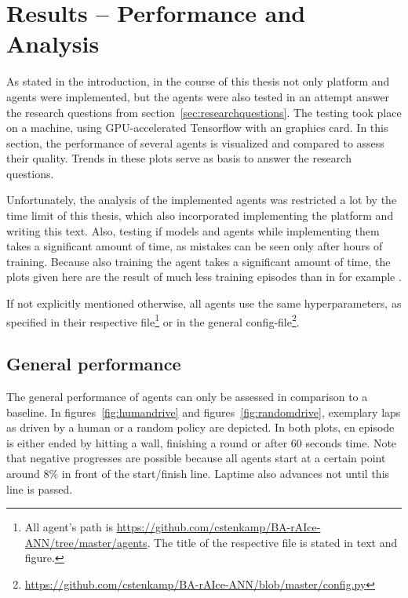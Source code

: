 \chapter{Results -- Performance and Analysis}

As stated in the introduction, in the course of this thesis not only platform and agents were implemented, but the agents were also tested in an attempt answer the research questions from section~\ref{sec:researchquestions}. The testing took place on a  machine, using GPU-accelerated Tensorflow with an  graphics card. In this section, the performance of several agents is visualized and compared to assess their quality. Trends in these plots serve as basis to answer the research questions. 

Unfortunately, the analysis of the implemented agents was restricted a lot by the time limit of this thesis, which also incorporated implementing the platform and writing this text. Also, testing if models and agents while implementing them takes a significant amount of time, as mistakes can be seen only after hours of training. Because also training the agent takes a significant amount of time, the plots given here are the result of much less training episodes than in for example \cite{mnih_human-level_2015}.

If not explicitly mentioned otherwise, all agents use the same hyperparameters, as specified in their respective file\footnote{All agent's path is \url{https://github.com/cstenkamp/BA-rAIce-ANN/tree/master/agents}. The title of the respective file is stated in text and figure.} or in the general config-file\footnote{\url{https://github.com/cstenkamp/BA-rAIce-ANN/blob/master/config.py}}.


\section{General performance}

The general performance of agents can only be assessed in comparison to a baseline. In figures~\ref{fig:humandrive} and figures~\ref{fig:randomdrive}, exemplary laps as driven by a human or a random policy are depicted. In both plots, en episode is either ended by hitting a wall, finishing a round or after 60 seconds time. Note that negative progresses are possible because all agents start at a certain point around $8\%$ in front of the start/finish line. Laptime also advances not until this line is passed.

